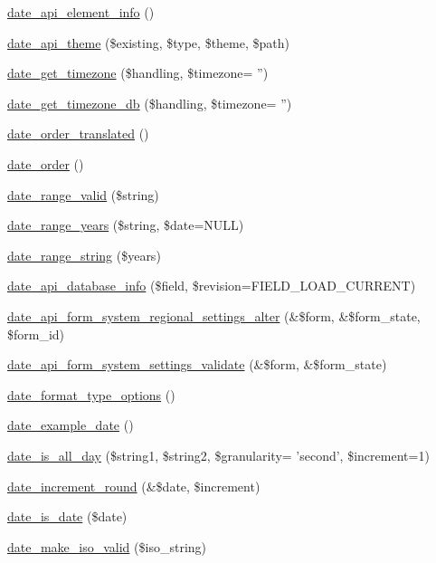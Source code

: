 \begin{DoxyCompactItemize}
\item 
\hyperlink{date__api_8module_a6b1b048f77260adfcab2add33ded37ec}{date\_\-api\_\-element\_\-info} ()
\item 
\hyperlink{date__api_8module_a9a35f6b3d4939f8df7d17ba1758aff7f}{date\_\-api\_\-theme} (\$existing, \$type, \$theme, \$path)
\item 
\hyperlink{date__api_8module_a623c76f08925c3c7699ca6d07da0d176}{date\_\-get\_\-timezone} (\$handling, \$timezone= '')
\item 
\hyperlink{date__api_8module_ac541e9141accfab7c7ace5ea3b54b7f8}{date\_\-get\_\-timezone\_\-db} (\$handling, \$timezone= '')
\item 
\hyperlink{date__api_8module_aa8e424ca2cbdf83c3f16be8192370ed8}{date\_\-order\_\-translated} ()
\item 
\hyperlink{date__api_8module_a44f5858b603c1aa92edba8f3c4cb2f5f}{date\_\-order} ()
\item 
\hyperlink{date__api_8module_a309e79ef85633987ce9641647d2e30ba}{date\_\-range\_\-valid} (\$string)
\item 
\hyperlink{date__api_8module_ad70e453c5a043e53649a771c3a6713cf}{date\_\-range\_\-years} (\$string, \$date=NULL)
\item 
\hyperlink{date__api_8module_abf93ddac7557727dde44e458d4471821}{date\_\-range\_\-string} (\$years)
\item 
\hyperlink{date__api_8module_a53245efe16c2d5ae6063e784952ef164}{date\_\-api\_\-database\_\-info} (\$field, \$revision=FIELD\_\-LOAD\_\-CURRENT)
\item 
\hyperlink{date__api_8module_acbea03931dc33c56ac72db2c8042f7a5}{date\_\-api\_\-form\_\-system\_\-regional\_\-settings\_\-alter} (\&\$form, \&\$form\_\-state, \$form\_\-id)
\item 
\hyperlink{date__api_8module_affcb2404b858829a6c6f2ac740541948}{date\_\-api\_\-form\_\-system\_\-settings\_\-validate} (\&\$form, \&\$form\_\-state)
\item 
\hyperlink{date__api_8module_ac1f737576353f61bc4b608ceb7cf76dc}{date\_\-format\_\-type\_\-options} ()
\item 
\hyperlink{date__api_8module_a01fa4c61620fadb6556eebfe51839314}{date\_\-example\_\-date} ()
\item 
\hyperlink{date__api_8module_a7a70b1226d53abc183edbf3dd1d8e7c7}{date\_\-is\_\-all\_\-day} (\$string1, \$string2, \$granularity= 'second', \$increment=1)
\item 
\hyperlink{date__api_8module_aad7435d8e7bdaed55be4d4934436d35c}{date\_\-increment\_\-round} (\&\$date, \$increment)
\item 
\hyperlink{date__api_8module_a1b6599e19acaf15b43eddb03b748b496}{date\_\-is\_\-date} (\$date)
\item 
\hyperlink{date__api_8module_afef4f46bfc76d3242b4ad842aa0fd225}{date\_\-make\_\-iso\_\-valid} (\$iso\_\-string)
\end{DoxyCompactItemize}


